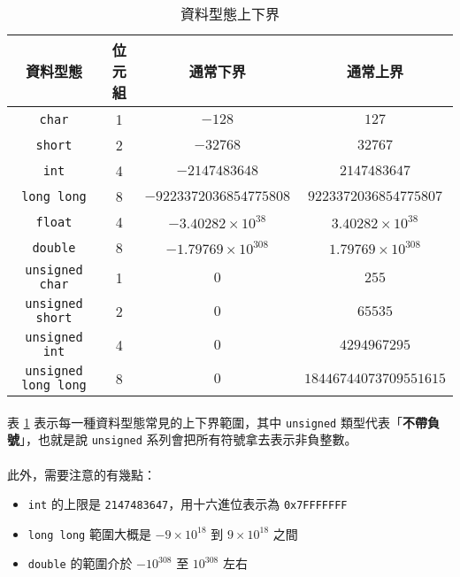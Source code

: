 \documentclass[12pt,a4paper,oneside]{article}
\begin{document}
\begin{CJK}{UTF8}{bkai}
\begin{table}[h!]
\centering
\begin{tabular}{|c|c|c|c|}
\hline
\textbf{資料型態} & \textbf{位元組} & \textbf{通常下界} & \textbf{通常上界}\\
\hline\hline
\lstinline!char!      & 1 & $-128$        & $127$       \\
\hline
\lstinline!short!     & 2 & $-32768$      & $32767$     \\
\hline
\lstinline!int!       & 4 & $-2147483648$ & $2147483647$\\
\hline
\lstinline!long long! & 8 & $-9223372036854775808$ & $9223372036854775807$\\
\hline
\lstinline!float!     & 4 & $-3.40282\times{10^{38}}$ & $3.40282\times{10^{38}}$\\
\hline
\lstinline!double!    & 8 & $-1.79769\times{10^{308}}$ & $1.79769\times{10^{308}}$\\
\hline
\lstinline!unsigned char!      & 1 & $0$ & $255$\\
\hline
\lstinline!unsigned short!     & 2 & $0$ & $65535$\\
\hline
\lstinline!unsigned int!       & 4 & $0$ & $4294967295$\\
\hline
\lstinline!unsigned long long! & 8 & $0$ & $18446744073709551615$\\
\hline
\end{tabular}
\caption{資料型態上下界}
\label{program:struct:table:datatype:limit}
\end{table}

\paragraph{}表 \ref{program:struct:table:datatype:limit} 表示每一種資料型態常見的上下界範圍，其中 \lstinline!unsigned! 類型代表「\textbf{不帶負號}」，也就是說 \lstinline!unsigned! 系列會把所有符號拿去表示非負整數。
\paragraph{}此外，需要注意的有幾點：
\begin{itemize}
\item \lstinline!int! 的上限是 \lstinline!2147483647!，用十六進位表示為 \lstinline!0x7FFFFFFF!
\item \lstinline!long long! 範圍大概是 $-9\times{10^{18}}$ 到 $9\times{10^{18}}$ 之間
\item \lstinline!double! 的範圍介於 $-{10}^{308}$ 至 ${10}^{308}$ 左右
\end{itemize}

\end{CJK}
\end{document}
